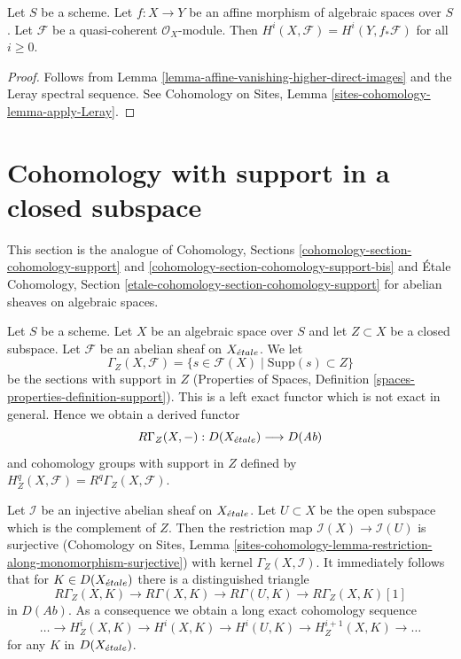 \begin{lemma}
\label{lemma-relative-affine-cohomology}
Let $S$ be a scheme. Let $f : X \to Y$ be an affine
morphism of algebraic spaces over $S$.
Let $\mathcal{F}$ be a quasi-coherent $\mathcal{O}_X$-module.
Then $H^i(X, \mathcal{F}) = H^i(Y, f_*\mathcal{F})$ for all $i \geq 0$.
\end{lemma}

\begin{proof}
Follows from Lemma \ref{lemma-affine-vanishing-higher-direct-images}
and the Leray spectral sequence. See
Cohomology on Sites, Lemma \ref{sites-cohomology-lemma-apply-Leray}.
\end{proof}






\section{Cohomology with support in a closed subspace}
\label{section-cohomology-support}

\noindent
This section is the analogue of Cohomology, Sections
\ref{cohomology-section-cohomology-support} and
\ref{cohomology-section-cohomology-support-bis}
and \'Etale Cohomology, Section
\ref{etale-cohomology-section-cohomology-support}
for abelian sheaves on algebraic spaces.

\medskip\noindent
Let $S$ be a scheme.
Let $X$ be an algebraic space over $S$ and let $Z \subset X$ be a closed
subspace. Let $\mathcal{F}$ be an abelian sheaf on $X_{\acute{e}tale}$. We let
$$
\Gamma_Z(X, \mathcal{F}) =
\{s \in \mathcal{F}(X) \mid \text{Supp}(s) \subset Z\}
$$
be the sections with support in $Z$
(Properties of Spaces, Definition \ref{spaces-properties-definition-support}).
This is a left exact functor which is not exact in general.
Hence we obtain a derived functor
$$
R\Gamma_Z(X, -) : D(X_{\acute{e}tale}) \longrightarrow D(\textit{Ab})
$$
and cohomology groups with support in $Z$ defined by
$H^q_Z(X, \mathcal{F}) = R^q\Gamma_Z(X, \mathcal{F})$.

\medskip\noindent
Let $\mathcal{I}$ be an injective abelian sheaf on $X_{\acute{e}tale}$. Let
$U \subset X$ be the open subspace which is the complement of $Z$.
Then the restriction map $\mathcal{I}(X) \to \mathcal{I}(U)$ is surjective
(Cohomology on Sites, Lemma
\ref{sites-cohomology-lemma-restriction-along-monomorphism-surjective})
with kernel $\Gamma_Z(X, \mathcal{I})$. It immediately follows that
for $K \in D(X_{\acute{e}tale})$ there is a distinguished triangle
$$
R\Gamma_Z(X, K) \to R\Gamma(X, K) \to R\Gamma(U, K) \to R\Gamma_Z(X, K)[1]
$$
in $D(\textit{Ab})$. As a consequence we obtain a long exact cohomology
sequence
$$
\ldots \to H^i_Z(X, K) \to H^i(X, K) \to H^i(U, K) \to
H^{i + 1}_Z(X, K) \to \ldots
$$
for any $K$ in $D(X_{\acute{e}tale})$.

